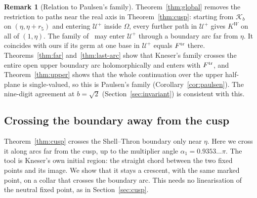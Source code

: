 \documentclass[11pt]{amsart}
\theoremstyle{definition}
\newtheorem{remark}[theorem]{Remark}
\newcommand{\Kk}{K}
\begin{document}
\begin{remark}[Relation to Paulsen's family]\label{rem:global-paulsen}
Theorem~\ref{thm:global} removes the restriction to paths near the real axis
in Theorem~\ref{thm:cusp}: starting from $\mathcal K_b$ on $(\eta,\eta+r_5)$ and entering
$\mathcal U^+$ inside $\Omega$, every further path in $\mathcal U^+$ gives $\Kk^W$ on all of
$(1,\eta)$.  The family of~\cite{Paulsen2019} may enter $\mathcal U^+$ through a boundary
arc far from $\eta$.  It coincides with ours if its germ at one base in $\mathcal U^+$
equals $F^{\rm tr}$ there.  Theorems~\ref{thm:far} and~\ref{thm:last-arc}
show that Kneser's family crosses the entire open upper boundary arc
holomorphically and enters with $F^{\rm tr}$, and Theorem~\ref{thm:upper} shows that the
whole continuation over the upper half-plane is single-valued, so this is
Paulsen's family (Corollary~\ref{cor:paulsen}).  The nine-digit agreement at $b=\sqrt2$
(Section~\ref{sec:invariant}) is consistent with this.
\end{remark}

\subsection{Crossing the boundary away from the cusp}\label{sec:far}
Theorem~\ref{thm:cusp} crosses the Shell--Thron boundary only near $\eta$.
Here we cross it along arcs far from the cusp, up to the multiplier angle
$\alpha_1=0.9353\ldots\pi$.  The tool is Kneser's own initial region: the
straight chord between the two fixed points and its image.  We show that it
stays a crescent, with the same marked point, on a collar that crosses the
boundary arc.  This needs no linearisation of the neutral fixed point, as in
Section~\ref{sec:cusp}.
\end{document}
